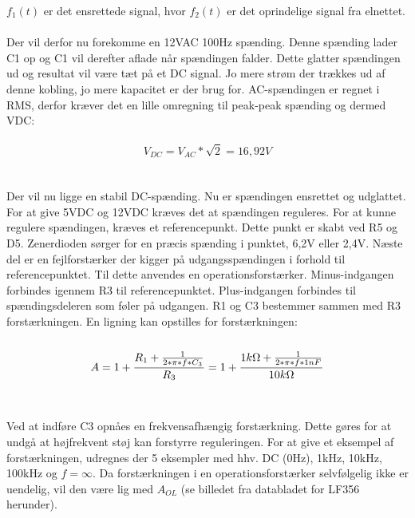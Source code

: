 $f_1(t)$ er det ensrettede signal, hvor $f_2(t)$ er det oprindelige signal fra elnettet.
\\\\
Der vil derfor nu forekomme en 12VAC 100Hz spænding. Denne spænding lader C1 op og C1 vil derefter aflade når spændingen falder.
Dette glatter spændingen ud og resultat vil være tæt på et DC signal. Jo mere strøm der trækkes ud af denne kobling, jo mere kapacitet er der brug for.
AC-spændingen er regnet i RMS, derfor kræver det en lille omregning til peak-peak spænding og dermed VDC:
\\\\
\begin{equation}
	V_{DC} = V_{AC} * \sqrt{2} = 16,92V
\end{equation}
\\\\
Der vil nu ligge en stabil DC-spænding. Nu er spændingen ensrettet og udglattet. For at give 5VDC og 12VDC kræves det at spændingen reguleres.
For at kunne regulere spændingen, kræves et referencepunkt. Dette punkt er skabt ved R5 og D5. Zenerdioden sørger for en præcis spænding
i punktet, 6,2V eller 2,4V. Næste del er en fejlforstærker der kigger på udgangsspændingen i forhold til referencepunktet.
Til dette anvendes en operationsforstærker. Minus-indgangen forbindes igennem R3 til referencepunktet. Plus-indgangen forbindes til
spændingsdeleren som føler på udgangen. R1 og C3 bestemmer sammen med R3 forstærkningen. En ligning kan opstilles for forstærkningen:
\\\\
\begin{equation}
	A = 1 + \frac{R_1 + \frac{1}{2*\pi*f*C_3}}{R_3} = 1 + \frac{1k\ohm + \frac{1}{2*\pi*f*1nF}}{10k\ohm}
\end{equation}
\\\\
Ved at indføre C3 opnåes en frekvensafhængig forstærkning. Dette gøres for at undgå at højfrekvent støj kan forstyrre reguleringen.
For at give et eksempel af forstærkningen, udregnes der 5 eksempler med hhv. DC (0Hz), 1kHz, 10kHz, 100kHz og $f = \infty$.
Da forstærkningen i en operationsforstærker selvfølgelig ikke er uendelig, vil den være lig med $A_{OL}$ (se billedet fra databladet for LF356 herunder).

